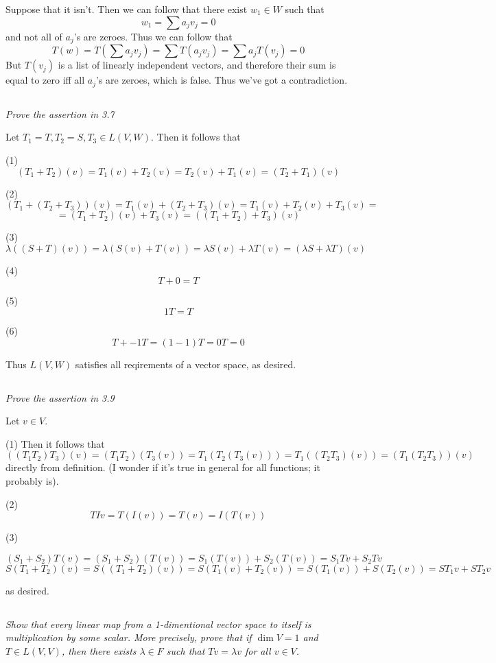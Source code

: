 \documentclass[11pt,oneside,titlepage]{book}
\begin{document}
Suppose that it isn't. Then we can follow that there exist $w_1 \in W$ such that
$$w_1 = \sum a_j v_j = 0$$
and not all of $a_j$'s are zeroes. Thus we can follow that
$$T(w) = T(\sum a_j v_j) = \sum T (a_j v_j) = \sum a_j T (v_j) = 0$$
But $T(v_j)$ is a list of linearly independent vectors, and therefore their sum is
equal to zero iff all $a_j$'s are zeroes, which is false. Thus we've got a contradiction.

\subsection{}
\textit{Prove the assertion in 3.7}

Let $T_1 = T, T_2 = S, T_3 \in L(V, W)$. Then it follows that

(1) $$(T_1 + T_2)(v) = T_1(v) + T_2(v) = T_2(v) + T_1(v) = (T_2 + T_1)(v)$$

(2) $$(T_1 + (T_2 + T_3))(v) = T_1(v) + (T_2 + T_3)(v) = T_1(v) + T_2(v) + T_3(v) =$$
$$ = (T_1 + T_2)(v) + T_3(v) = ((T_1 + T_2) + T_3)(v)$$

(3) $$\lambda((S + T)(v)) = \lambda ( S(v) + T(v)) = \lambda S(v) + \lambda T(v)
= (\lambda S + \lambda T)(v)$$

(4) $$T + 0 = T$$

(5) $$1T = T$$

(6) $$T + -1T = (1 - 1)T = 0T = 0$$

Thus $L(V, W)$ satisfies all reqirements of a vector space, as desired.

\subsection{}
\textit{Prove the assertion in 3.9}

Let $v \in V$.

(1) Then it follows that
$$((T_1 T_2)T_3)(v) = (T_1 T_2)( T_3(v)) =  T_1 (T_2( T_3(v))) = T_1 ((T_2 T_3)(v))
= (T_1(T_2 T_3))(v)$$
directly from definition. (I wonder if it's  true in general for all functions; it probably
is).

(2)
$$ TI v = T(I(v)) = T(v) = I (T(v))$$

(3)

$$(S_1 + S_2)T(v) = (S_1 + S_2)(T(v)) = S_1(T(v)) + S_2(T(v)) = S_1 T v + S_2 T v$$
$$S(T_1 + T_2)(v) = S((T_1 + T_2)(v)) = S(T_1(v) + T_2(v)) = S(T_1(v)) + S(T_2(v)) = S T_1 v +
S T_2 v$$

as desired.

\subsection{}
\textit{Show that every linear map from a 1-dimentional vector space to itself is
  multiplication by some scalar. More precisely, prove that if $\dim V = 1$ and
  $T \in L(V, V)$, then there exists $\lambda \in F$ such that $Tv = \lambda v$ for
  all $v \in V$.}
\end{document}
